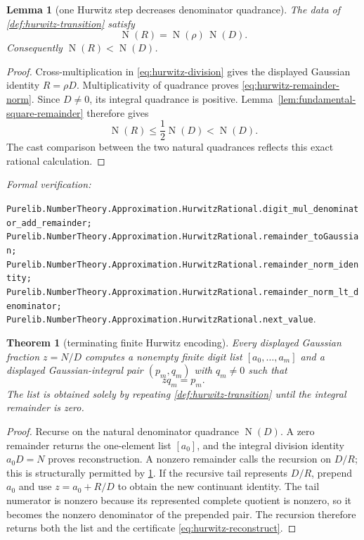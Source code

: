 \documentclass[11pt]{article}
\newtheorem{theorem}{Theorem}[section]
\newtheorem{lemma}[lemma]{Lemma}
\newcommand{\Norm}[1]{\operatorname{N}\!\left(#1\right)}
\newcommand{\leanref}[1]{\par\smallskip\noindent
  \emph{Formal verification:}\par\nobreak
  {\raggedright\nolinkurl{#1}.\par}}
\begin{document}
\begin{lemma}[one Hurwitz step decreases denominator quadrance]
\label{lem:hurwitz-decrease}
The data of \cref{def:hurwitz-transition} satisfy
\begin{equation}
\label{eq:hurwitz-remainder-norm}
                 \Norm R=\Norm\rho\,\Norm D.
\end{equation}
Consequently $\Norm R<\Norm D$.
\end{lemma}

\begin{proof}
Cross-multiplication in \eqref{eq:hurwitz-division} gives the displayed
Gaussian identity $R=\rho D$.  Multiplicativity of quadrance proves
\eqref{eq:hurwitz-remainder-norm}.  Since $D\ne0$, its integral quadrance is
positive.  Lemma~\ref{lem:fundamental-square-remainder} therefore gives
\[
       \Norm R\le\frac12\Norm D<\Norm D.
\]
The cast comparison between the two natural quadrances reflects this exact
rational calculation.
\end{proof}

\leanref{Purelib.NumberTheory.Approximation.HurwitzRational.digit_mul_denominator_add_remainder;
Purelib.NumberTheory.Approximation.HurwitzRational.remainder_toGaussian;
Purelib.NumberTheory.Approximation.HurwitzRational.remainder_norm_identity;
Purelib.NumberTheory.Approximation.HurwitzRational.remainder_norm_lt_denominator;
Purelib.NumberTheory.Approximation.HurwitzRational.next_value}

\begin{theorem}[terminating finite Hurwitz encoding]
\label{thm:finite-hurwitz-encoding}
Every displayed Gaussian fraction $z=N/D$ computes a nonempty finite digit
list $[a_0,\ldots,a_m]$ and a displayed Gaussian-integral pair $(p_m,q_m)$
with $q_m\ne0$ such that
\begin{equation}
\label{eq:hurwitz-reconstruct}
                         zq_m=p_m.
\end{equation}
The list is obtained solely by repeating \cref{def:hurwitz-transition} until
the integral remainder is zero.
\end{theorem}

\begin{proof}
Recurse on the natural denominator quadrance $\Norm D$.  A zero remainder
returns the one-element list $[a_0]$, and the integral division identity
$a_0D=N$ proves reconstruction.  A nonzero remainder calls the recursion on
$D/R$; this is structurally permitted by \cref{lem:hurwitz-decrease}.  If the
recursive tail represents $D/R$, prepend $a_0$ and use
$z=a_0+R/D$ to obtain the new continuant identity.  The tail numerator is
nonzero because its represented complete quotient is nonzero, so it becomes
the nonzero denominator of the prepended pair.  The recursion therefore
returns both the list and the certificate \eqref{eq:hurwitz-reconstruct}.
\end{proof}
\end{document}

